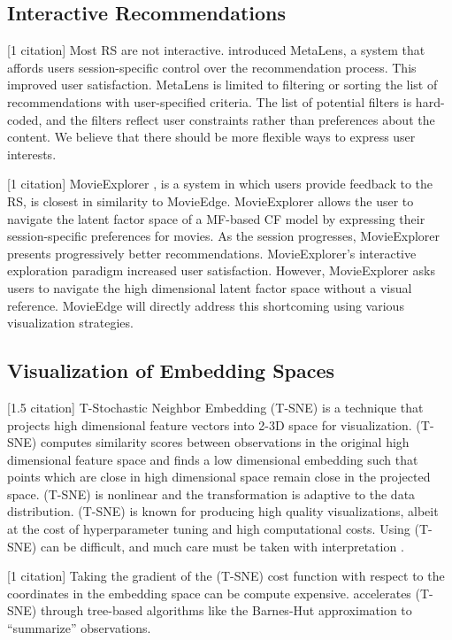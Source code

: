 \subsection{Interactive Recommendations}

[1 citation] Most RS are not interactive. \cite{schafer2002meta} introduced MetaLens, a system that affords users session-specific control over the recommendation process. This improved user satisfaction. MetaLens is limited to filtering or sorting the list of recommendations with user-specified criteria. The list of potential filters is hard-coded, and the filters reflect user constraints rather than preferences about the content. We believe that there should be more flexible ways to express user interests.

[1 citation] MovieExplorer \cite{taijala2018movieexplorer}, is a system in which users provide feedback to the RS, is closest in similarity to MovieEdge. MovieExplorer allows the user to navigate the latent factor space of a MF-based CF model by expressing their session-specific preferences for movies.  As the session progresses, MovieExplorer presents progressively better recommendations. MovieExplorer’s interactive exploration paradigm increased user satisfaction. However, MovieExplorer asks users to navigate the high dimensional latent factor space without a visual reference. MovieEdge will directly address this shortcoming using various visualization strategies.

\subsection{Visualization of Embedding Spaces}

[1.5 citation] T-Stochastic Neighbor Embedding \mbox{(T-SNE)} \cite{maaten2008visualizing} is a technique that projects high dimensional feature vectors into 2-3D space for visualization. \mbox{(T-SNE)} computes similarity scores between observations in the original high dimensional feature space and finds a low dimensional embedding such that points which are close in high dimensional space remain close in the projected space. \mbox{(T-SNE)} is nonlinear and the transformation is adaptive to the data distribution. \mbox{(T-SNE)} is known for producing high quality visualizations, albeit at the cost of hyperparameter tuning and high computational costs. Using \mbox{(T-SNE)} can be difficult, and much care must be taken with interpretation \cite{wattenberg2016how}.

[1 citation] Taking the gradient of the \mbox{(T-SNE)} cost function with respect to the coordinates in the embedding space can be compute expensive.  \cite{van2014accelerating} accelerates \mbox{(T-SNE)} through tree-based algorithms like the Barnes-Hut approximation to “summarize” observations.  

